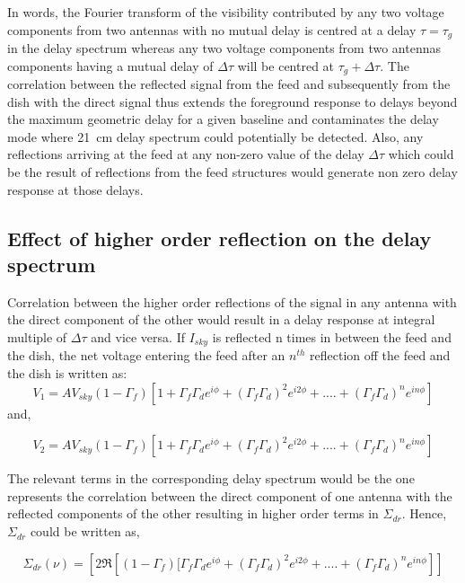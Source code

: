 \documentclass[12pt,preprint]{aastex}
\begin{document}
 In words, the Fourier transform of the visibility contributed by any two voltage components from two antennas with no mutual delay is centred at a delay $\tau = \tau_{g}$ in the delay spectrum whereas any two voltage components from two antennas components having a mutual delay of $\Delta \tau$ will be centred at $\tau_{g} +\Delta \tau$. The correlation between the reflected signal  from the feed and subsequently from the dish with the direct signal thus extends the foreground response to delays beyond the maximum geometric delay for a given baseline and contaminates the delay mode where 21~cm delay spectrum could potentially be detected. Also, any reflections arriving at the feed at any non-zero  value of the delay $\Delta \tau$ which could be the result of reflections from the feed structures would generate non zero delay response at those delays. 

\subsection{Effect of higher order reflection on the delay spectrum} 
Correlation between the higher order reflections of the signal in any antenna with the direct component of the other would result in a delay response at integral multiple of $\Delta \tau$ and vice versa. 
If $I_{sky}$ is reflected n times in between the feed and the dish, the net voltage entering the feed after an
$n^{th}$ reflection off the feed and the dish is written as:
\begin{equation}
V_{1} =  A V_{sky}(1-\Gamma_{f})[1+ \Gamma_{f}\Gamma_{d} e^{i\phi}+ (\Gamma_{f}\Gamma_{d})^2e^{i2\phi}+ ....+ (\Gamma_{f}\Gamma_{d})^{n}e^{in\phi}]
\end{equation}
and, 

\begin{equation}
V_{2} = A V_{sky}(1-\Gamma_{f})[1+ \Gamma_{f}\Gamma_{d} e^{i\phi}+ (\Gamma_{f}\Gamma_{d})^2e^{i2\phi}+ ....+ (\Gamma_{f}\Gamma_{d})^{n}e^{in\phi}]
\end{equation}

The relevant terms in the corresponding delay spectrum would be the one represents the correlation between the direct component of one antenna with the reflected components of the other resulting in higher order terms  in $\Sigma_{dr}$. Hence, $\Sigma_{dr}$ could be written as, 

\begin{equation}
\Sigma_{dr}(\nu) = \left [ 2 \Re \left [(1-\Gamma_{f})[ \Gamma_{f}\Gamma_{d} e^{i\phi}+ (\Gamma_{f}\Gamma_{d})^2e^{i2\phi}+ ....+ (\Gamma_{f}\Gamma_{d})^{n}e^{in\phi} \right ] \right ]
\end{equation}
\end{document}
